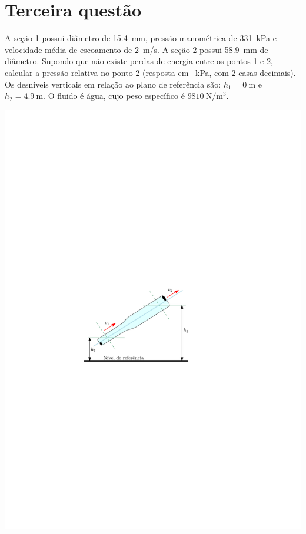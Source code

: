 \documentclass[a4paper, 12pt, brazilian]{article}
\begin{document}
	\section{Terceira questão}
	A seção 1 possui diâmetro de \SI{15.4}{\milli\meter}, pressão manométrica de \SI{331}{\kilo\pascal} e velocidade média de escoamento de \SI{2}{\meter/\second}. A seção 2 possui \SI{58.9}{\milli\meter} de diâmetro. Supondo que não existe perdas de energia entre os pontos 1 e 2, calcular a pressão relativa no ponto 2 (resposta em \SI{}{\kilo\pascal}, com 2 casas decimais). Os desníveis verticais em relação ao plano de referência são: $h_{1}=\SI{0}{\meter}$ e $h_{2}=\SI{4.9}{\meter}$. O fluido é água, cujo peso específico é $\SI{9810}{\newton/\meter^{3}}$.
	\begin{center}
		\includegraphics[width=.6\linewidth]{assets/images/ex3}
	\end{center}
\end{document}
